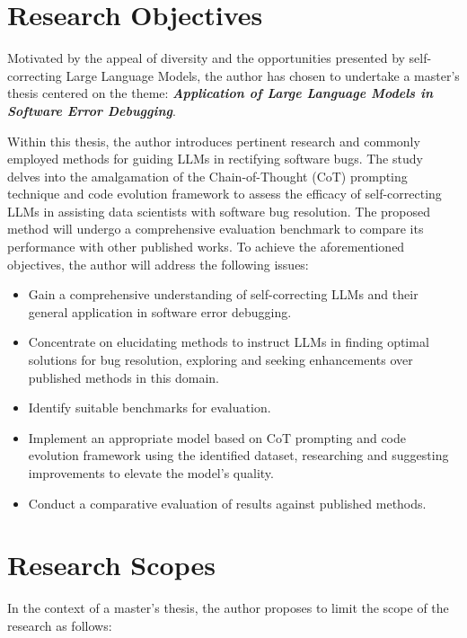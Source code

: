 \documentclass[a4paper,oneside]{book}
\begin{document}
\section{Research Objectives}
Motivated by the appeal of diversity and the opportunities presented by self-correcting Large Language Models, the author has chosen to undertake a master's thesis centered on the theme: \textbf{\textit{Application of Large Language Models in Software Error Debugging}}.

Within this thesis, the author introduces pertinent research and commonly employed methods for guiding LLMs in rectifying software bugs. The study delves into the amalgamation of the Chain-of-Thought (CoT) prompting technique and code evolution framework to assess the efficacy of self-correcting LLMs in assisting data scientists with software bug resolution. The proposed method will undergo a comprehensive evaluation benchmark to compare its performance with other published works. To achieve the aforementioned objectives, the author will address the following issues:

\begin{itemize}
  \item Gain a comprehensive understanding of self-correcting LLMs and their general application in software error debugging.

  \item Concentrate on elucidating methods to instruct LLMs in finding optimal solutions for bug resolution, exploring and seeking enhancements over published methods in this domain.

  \item Identify suitable benchmarks for evaluation.

  \item Implement an appropriate model based on CoT prompting and code evolution framework using the identified dataset, researching and suggesting improvements to elevate the model's quality.

  \item Conduct a comparative evaluation of results against published methods.
\end{itemize}

\section{Research Scopes}
In the context of a master's thesis, the author proposes to limit the scope of the research as follows:
\end{document}
